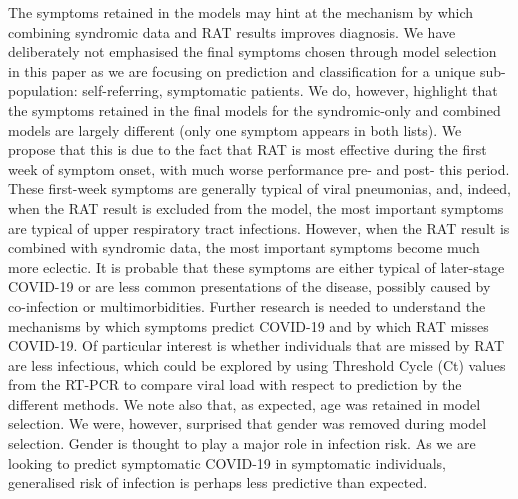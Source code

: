 \documentclass[]{elsarticle} %
\begin{document}
The symptoms retained in the models may hint at the mechanism by which
combining syndromic data and RAT results improves diagnosis. We have
deliberately not emphasised the final symptoms chosen through model
selection in this paper as we are focusing on prediction and
classification for a unique sub-population: self-referring, symptomatic
patients. We do, however, highlight that the symptoms retained in the
final models for the syndromic-only and combined models are largely
different (only one symptom appears in both lists). We propose that this
is due to the fact that RAT is most effective during the first week of
symptom onset, with much worse performance pre- and post- this period.
These first-week symptoms are generally typical of viral pneumonias,
and, indeed, when the RAT result is excluded from the model, the most
important symptoms are typical of upper respiratory tract infections.
However, when the RAT result is combined with syndromic data, the most
important symptoms become much more eclectic. It is probable that these
symptoms are either typical of later-stage COVID-19 or are less common
presentations of the disease, possibly caused by co-infection or
multimorbidities. Further research is needed to understand the
mechanisms by which symptoms predict COVID-19 and by which RAT misses
COVID-19. Of particular interest is whether individuals that are missed
by RAT are less infectious, which could be explored by using Threshold
Cycle (Ct) values from the RT-PCR to compare viral load with respect to
prediction by the different methods. We note also that, as expected, age
was retained in model selection. We were, however, surprised that gender
was removed during model selection. Gender is thought to play a major
role in infection risk. As we are looking to predict symptomatic
COVID-19 in symptomatic individuals, generalised risk of infection is
perhaps less predictive than expected.
\end{document}
